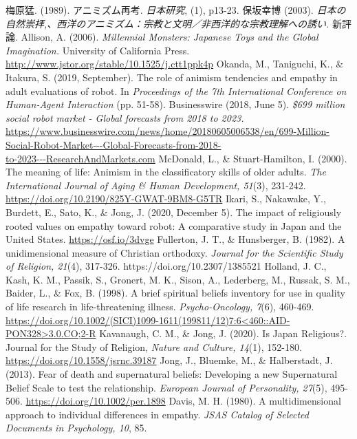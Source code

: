 \documentclass[a4j,12pt]{jreport}
\begin{document}
\begin{thebibliography}{999}
 梅原猛. (1989). アニミズム再考. \textsl{日本研究}, (1), p13-23.
 保坂幸博 (2003). \textsl{日本の自然崇拝,、西洋のアニミズム：宗教と文明／非西洋的な宗教理解への誘い.} 新評論.
 Allison, A. (2006). \textsl{Millennial Monsters: Japanese Toys and the Global Imagination.} University of California Press. \url{http://www.jstor.org/stable/10.1525/j.ctt1ppk4p}
 Okanda, M., Taniguchi, K., \& Itakura, S. (2019, September). The role of animism tendencies and empathy in adult evaluations of robot. In \textsl{Proceedings of the 7th International Conference on Human-Agent Interaction} (pp. 51-58).
 Businesswire (2018, June 5). \textsl{\$699 million social robot market - Global forecasts from 2018 to 2023.} \url{https://www.businesswire.com/news/home/20180605006538/en/699-Million-Social-Robot-Market---Global-Forecasts-from-2018-}\\\url{to-2023---ResearchAndMarkets.com}
 McDonald, L., \& Stuart-Hamilton, I. (2000). The meaning of life: Animism in the classificatory skills of older adults. \textsl{The International Journal of Aging \& Human Development, 51}(3), 231-242. \url{https://doi.org/10.2190/825Y-GWAT-9BM8-G5TR}
 Ikari, S., Nakawake, Y., Burdett, E., Sato, K., \& Jong, J. (2020, December 5). The impact of religiously rooted values on empathy toward robot: A comparative study in Japan and the United States. \url{https://osf.io/3dvge}
 Fullerton, J. T., \& Hunsberger, B. (1982). A unidimensional measure of Christian orthodoxy. \textsl{Journal for the Scientific Study of Religion, 21}(4), 317-326. https://doi.org/10.2307/1385521
 Holland, J. C., Kash, K. M., Passik, S., Gronert, M. K., Sison, A., Lederberg, M., Russak, S. M., Baider, L., \& Fox, B. (1998). A brief spiritual beliefs inventory for use in quality of life research in life-threatening illness. \textsl{Psycho-Oncology, 7}(6), 460-469. \url{https://doi.org/10.1002/(SICI)1099-1611(199811/12)7:6<460::AID-PON328>3.0.CO;2-R}
 Kavanaugh, C. M., \& Jong, J. (2020). Is Japan Religious?. Journal for the Study of Religion, \textsl{Nature and Culture, 14}(1), 152-180. \url{https://doi.org/10.1558/jsrnc.39187}
 Jong, J., Bluemke, M., \& Halberstadt, J. (2013). Fear of death and supernatural beliefs: Developing a new Supernatural Belief Scale to test the relationship. \textsl{European Journal of Personality, 27}(5), 495-506. \url{https://doi.org/10.1002/per.1898}
 Davis, M. H. (1980). A multidimensional approach to individual differences in empathy. \textsl{JSAS Catalog of Selected Documents in Psychology, 10}, 85.

\end{thebibliography}
\end{document}
